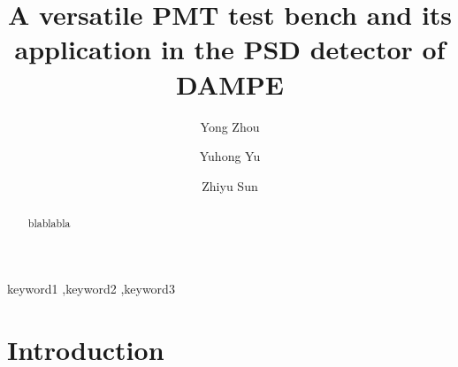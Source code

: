 \documentclass[5p, times]{elsarticle}
\begin{document}
\begin{frontmatter}

\title{A versatile PMT test bench and its application in the PSD detector of DAMPE}

\author[imp, ucas, lzu]{Yong Zhou}

\author[imp]{Yuhong Yu}

\author[imp]{Zhiyu Sun}


\address[imp]{Institute of Modern Physicas, Chinese Academy of Sciences,  509 Nanchang Road,  Lanzhou,  730000,  P.R.China}
\address[ucas]{Graduate University of the Chinese Academy of Sciences,  19A Yuquan Road,  Beijing,  100049,  P.R.China}
\address[lzu]{School of Nuclear Science and Technology,  Lanzhou University,  222 South Tianshui Road,  Lanzhou,  730000,  P.R.China}

\begin{abstract}
blablabla
\end{abstract}

\begin{keyword}
keyword1
\sep keyword2
\sep keyword3



\end{keyword}

\end{frontmatter}

\section{Introduction}
\label{sec:introduction}
\end{document}
